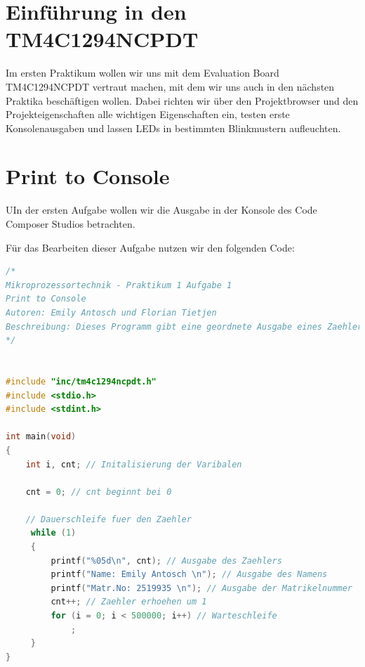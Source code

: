 \documentclass{article}
\begin{document}
\newpage


\tableofcontents

\listoffigures

\lstlistoflistings

\newpage

\section{Einführung in den TM4C1294NCPDT}

Im ersten Praktikum wollen wir uns mit dem Evaluation Board TM4C1294NCPDT vertraut machen,
mit dem wir uns auch in den nächsten Praktika beschäftigen wollen. Dabei richten wir
über den Projektbrowser und den Projekteigenschaften alle wichtigen Eigenschaften ein,
testen erste Konsolenausgaben und lassen LEDs in bestimmten Blinkmustern aufleuchten.


\section{Print to Console}

\begin{task}
UIn der ersten Aufgabe wollen wir die Ausgabe in der Konsole des Code Composer Studios
betrachten. 
\end{task}
  
Für das Bearbeiten dieser Aufgabe nutzen wir den folgenden Code:

\begin{lstlisting}[language=c, caption={printToConsole.c}, captionpos=b]
/*
Mikroprozessortechnik - Praktikum 1 Aufgabe 1
Print to Console
Autoren: Emily Antosch und Florian Tietjen
Beschreibung: Dieses Programm gibt eine geordnete Ausgabe eines Zaehlers, eines Namens und einer Matrikelnummer in der Konsole aus.
*/


#include "inc/tm4c1294ncpdt.h"
#include <stdio.h>
#include <stdint.h>

int main(void)
{
    int i, cnt; // Initalisierung der Varibalen

    cnt = 0; // cnt beginnt bei 0

    // Dauerschleife fuer den Zaehler
     while (1)
     {
         printf("%05d\n", cnt); // Ausgabe des Zaehlers
         printf("Name: Emily Antosch \n"); // Ausgabe des Namens
         printf("Matr.No: 2519935 \n"); // Ausgabe der Matrikelnummer
         cnt++; // Zaehler erhoehen um 1
         for (i = 0; i < 500000; i++) // Warteschleife
             ;
     }
}

  
\end{lstlisting}
\end{document}
